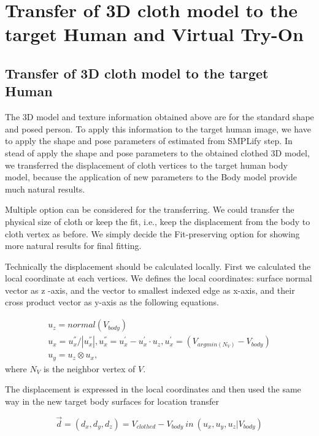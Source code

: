 \section{Transfer of 3D cloth model to the target Human and Virtual Try-On }  \label{section:clothtransfer}


\subsection{Transfer of 3D cloth model to the target Human} 

The 3D model and texture information obtained above are for the standard shape and posed person. To apply this information to the target human image, we have to apply the shape and pose parameters of estimated from SMPLify\cite{Bogo2016SMPLify} step.  In stead of apply the shape and pose parameters to the obtained clothed 3D model, we transferred the displacement of cloth vertices to the target human body model, because the application of new parameters to the Body model provide much natural results.      

Multiple option can be considered for the transferring. We could transfer the physical size of cloth or keep the fit, i.e., keep the displacement from the body to cloth vertex as before.  We simply decide the Fit-preserving option for showing more natural results for final fitting.  

Technically the displacement should be calculated locally. First we calculated the local coordinate at each vertices. We defines the local coordinates: surface normal vector as z -axis, and the vector to smallest indexed edge as x-axis, and their cross product vector as y-axis as the following equations.
 

\begin{align}
 u_{z} =  normal(V_{body})  \\
 u_{x} = u^{''}_{x}/ |u^{''}_{x} |, 
 u^{''}_{x} = u^{'}_{x} - u^{'}_{x} \cdot u_{z}, 
 u^{'}_{x} = (V_{argmin(N_V) } - V_{body}) \\
 u_{y}  =  u_z \otimes u_x,
\end{align} 
 where $N_V$ is the neighbor vertex of $V$.
 

The displacement is expressed in the local coordinates and then used the same way in the new target body surfaces for location transfer

\begin{equation}
\overrightarrow{d} = (d_x, d_y, d_z) = V_{clothed} - V_{body} \: in \: (u_x, u_y, u_z | V_{body})
\end{equation}


